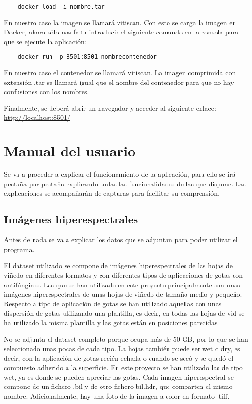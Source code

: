 \begin{verbatim}
    docker load -i nombre.tar
\end{verbatim}

En nuestro caso la imagen se llamará vitiscan.
Con esto se carga la imagen en Docker, ahora sólo nos falta introducir el siguiente comando en la consola para que se ejecute la aplicación:

\begin{verbatim}
    docker run -p 8501:8501 nombrecontenedor
\end{verbatim}

En nuestro caso el contenedor se llamará vitiscan.
La imagen comprimida con extensión .tar se llamará igual que el nombre del contenedor para que no hay confusiones con los nombres.

Finalmente, se deberá abrir un navegador y acceder al siguiente enlace:
\href{http://localhost:8501/}{http://localhost:8501/}

\section{Manual del usuario}
Se va a proceder a explicar el funcionamiento de la aplicación, para ello se irá pestaña por pestaña explicando todas las funcionalidades de las que dispone. Las explicaciones se acompañarán de capturas para facilitar su comprensión.

\subsection{Imágenes hiperespectrales}
Antes de nada se va a explicar los datos que se adjuntan para poder utilizar el programa.

El dataset utilizado se compone de imágenes hiperespectrales de las hojas de viñedo en diferentes formatos y con diferentes tipos de aplicaciones de gotas con antifúngicos.
Las que se han utilizado en este proyecto principalmente son unas imágenes hiperespectrales de unas hojas de viñedo de tamaño medio y pequeño. Respecto a tipo de aplicación de gotas se han utilizado aquellas con unas dispersión de gotas utilizando una plantilla, es decir, en todas las hojas de vid se ha utilizado la misma plantilla y las gotas están en posiciones parecidas. 

No se adjunta el dataset completo porque ocupa más de 50 GB, por lo que se han seleccionado unas pocas de cada tipo. La hojas también puede ser wet o dry, es decir, con la aplicación de gotas recién echada o cuando se secó y se quedó el compuesto adherido a la superficie. En este proyecto se han utilizado las de tipo wet, ya es donde se pueden apreciar las gotas. Cada imagen hiperespectral se compone de un fichero .bil y de otro fichero bil.hdr, que comparten el mismo nombre. Adicionalmente, hay una foto de la imagen a color en formato .tiff.

